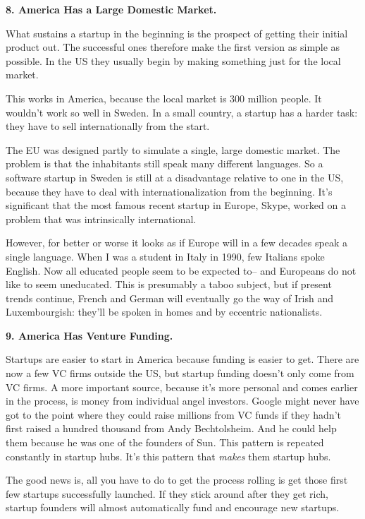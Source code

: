 \textbf{8. America Has a Large Domestic Market.}

What sustains a startup in the beginning is the prospect of getting
their initial product out. The successful ones therefore make the first
version as simple as possible. In the US they usually begin by making
something just for the local market.

This works in America, because the local market is 300 million people.
It wouldn't work so well in Sweden. In a small country, a startup has a
harder task: they have to sell internationally from the start.

The EU was designed partly to simulate a single, large domestic market.
The problem is that the inhabitants still speak many different
languages. So a software startup in Sweden is still at a disadvantage
relative to one in the US, because they have to deal with
internationalization from the beginning. It's significant that the most
famous recent startup in Europe, Skype, worked on a problem that was
intrinsically international.

However, for better or worse it looks as if Europe will in a few decades
speak a single language. When I was a student in Italy in 1990, few
Italians spoke English. Now all educated people seem to be expected to--
and Europeans do not like to seem uneducated. This is presumably a taboo
subject, but if present trends continue, French and German will
eventually go the way of Irish and Luxembourgish: they'll be spoken in
homes and by eccentric nationalists.

\textbf{9. America Has Venture Funding.}

Startups are easier to start in America because funding is easier to
get. There are now a few VC firms outside the US, but startup funding
doesn't only come from VC firms. A more important source, because it's
more personal and comes earlier in the process, is money from individual
angel investors. Google might never have got to the point where they
could raise millions from VC funds if they hadn't first raised a hundred
thousand from Andy Bechtolsheim. And he could help them because he was
one of the founders of Sun. This pattern is repeated constantly in
startup hubs. It's this pattern that \emph{makes} them startup hubs.

The good news is, all you have to do to get the process rolling is get
those first few startups successfully launched. If they stick around
after they get rich, startup founders will almost automatically fund and
encourage new startups.

